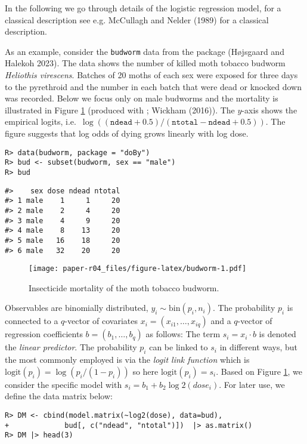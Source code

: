 In the following we go through details of the logistic regression model,
for a classical description see e.g. McCullagh and Nelder (1989) for a classical description.

As an example, consider the \texttt{budworm} data from the  package (Højsgaard and Halekoh 2023).
The data shows the number of killed moth tobacco budworm
\emph{Heliothis virescens}. Batches of 20 moths of each sex were
exposed for three days to the pyrethroid and the number in each batch
that were dead or knocked down was recorded.
Below we focus only on male budworms and the mortality is illustrated
in Figure \ref{fig:budworm} (produced with ; Wickham (2016)). The \(y\)-axis shows the empirical
logits, i.e.~\(\log((\texttt{ndead} + 0.5)/(\texttt{ntotal}-\texttt{ndead} + 0.5))\). The figure suggests that log odds of dying grows linearly with log dose.

\begin{verbatim}
R> data(budworm, package = "doBy")
R> bud <- subset(budworm, sex == "male")
R> bud
\end{verbatim}

\begin{verbatim}
#>    sex dose ndead ntotal
#> 1 male    1     1     20
#> 2 male    2     4     20
#> 3 male    4     9     20
#> 4 male    8    13     20
#> 5 male   16    18     20
#> 6 male   32    20     20
\end{verbatim}

\begin{figure}
\centering
\texttt{[image: paper-r04\_files/figure-latex/budworm-1.pdf]}
\caption{\label{fig:budworm}Insecticide mortality of the moth tobacco budworm.}
\end{figure}

Observables are binomially distributed, \(y_i \sim \text{bin}(p_i, n_i)\). The probability \(p_i\) is connected to a \(q\)-vector of
covariates \(x_i=(x_{i1}, \dots, x_{iq})\) and a \(q\)-vector of
regression coefficients \(b=(b_1, \dots, b_q)\) as follows: The term
\(s_i = x_i \cdot b\) is denoted the \emph{linear predictor}. The
probability \(p_i\) can be linked to \(s_i\) in different ways, but the
most commonly employed is via the \emph{logit link function} which is
\(\text{logit}(p_i) = \log(p_i/(1-p_i))\) so here \(\text{logit}(p_i) = s_i\). Based on Figure \ref{fig:budworm}, we consider the specific
model with \(s_i = b_1 + b_2 \log2(dose_i)\). For later use, we define the data matrix below:

\begin{verbatim}
R> DM <- cbind(model.matrix(~log2(dose), data=bud),
+             bud[, c("ndead", "ntotal")])  |> as.matrix()
R> DM |> head(3)
\end{verbatim}

